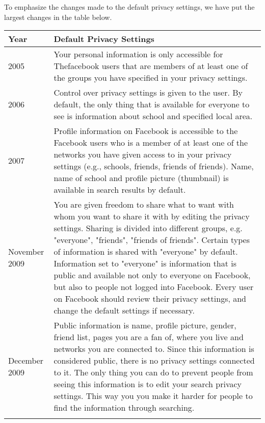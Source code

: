 To emphasize the changes made to the default privacy settings, we have put the largest changes in the table below. 
\begin{center}
    \begin{tabular}{ | l | p{9cm} |}
    \hline
    \textbf{Year} & \textbf{Default Privacy Settings} \\ 
    \hline
    2005 & Your personal information is only accessible for 			Thefacebook users that are members of at least one of the 			groups you have specified in your privacy settings.\\ 
    \hline
    2006 & Control over privacy settings is given to the user. By 		default, the only thing that is available for everyone to see 		is information about school and specified local area. \\ 
    \hline
    2007 & Profile information on Facebook is accessible to the 		Facebook users who is a member of at least one of the networks 		you have given access to in your privacy settings (e.g., 			schools, friends, friends of friends). Name, name of school and 	profile picture (thumbnail) is available in search results by 		default.\\
    \hline
    November 2009 & You are given freedom to share what to want 		with whom you want to share it with by editing the privacy 			settings. Sharing is divided into different groups, e.g. 			"everyone", "friends", "friends of friends". Certain types of		information is shared with "everyone" by default. Information 		set to "everyone" is information that is public and available 		not only to everyone on Facebook, but also to people not logged 	into Facebook. Every user on Facebook should review their 			privacy settings, and change the default settings if necessary.
	\\
	\hline
    December 2009 & Public information is name, profile picture, 		gender, friend list, pages you are a fan of, where you live and 	networks you are connected to. Since this information is 			considered public, there is no privacy settings connected to 		it. The only thing you can do to prevent people from seeing 		this information is to edit your search privacy settings. This 		way you you make it harder for people to find the 					information through searching. \\
    \hline
     \\
    \hline
    \end{tabular}
\end{center}



\markboth{}{}
